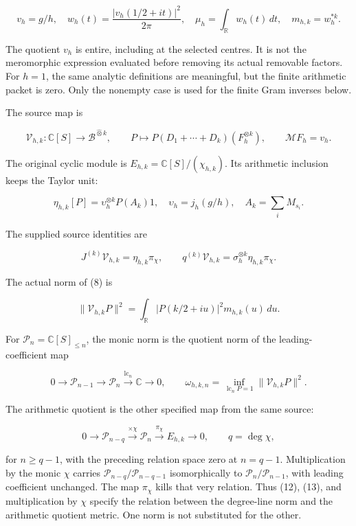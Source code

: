 \documentclass[
  11pt,
]{article}
\begin{document}
\[
 v_h=g/h,\quad
 w_h(t)=\frac{|v_h(1/2+it)|^2}{2\pi},\quad
 \mu_h=\int_{\mathbb R}w_h(t)\,dt,\quad m_{h,k}=w_h^{*k}.               \tag{7}
\]

The quotient \(v_h\) is entire, including at the selected centres. It is
not the meromorphic expression evaluated before removing its actual
removable factors. For \(h=1\), the same analytic definitions are
meaningful, but the finite arithmetic packet is zero. Only the nonempty
case is used for the finite Gram inverses below.

The source map is

\[
 \mathcal V_{h,k}:\mathbb C[S]\longrightarrow\mathscr B^{\widehat\otimes k},
 \qquad P\longmapsto P(D_1+\cdots+D_k)(F_h^{\otimes k}),\qquad
 \mathcal MF_h=v_h.                                                    \tag{8}
\]

The original cyclic module is \(E_{h,k}=\mathbb C[S]/(\chi_{h,k})\). Its
arithmetic inclusion keeps the Taylor unit:

\[
 \eta_{h,k}[P]=\upsilon_h^{\otimes k}P(A_k)1,\quad
 \upsilon_h=j_h(g/h),\quad A_k=\sum_iM_{s_i}.                           \tag{9}
\]

The supplied source identities are

\[
 J^{(k)}\mathcal V_{h,k}=\eta_{h,k}\pi_\chi,\qquad
 q^{(k)}\mathcal V_{h,k}=\sigma_h^{\otimes k}\eta_{h,k}\pi_\chi.          \tag{10}
\]

The actual norm of (8) is

\[
 \|\mathcal V_{h,k}P\|^2
 =\int_{\mathbb R}|P(k/2+iu)|^2m_{h,k}(u)\,du.                          \tag{11}
\]

For \(\mathcal P_n=\mathbb C[S]_{\le n}\), the monic norm is the
quotient norm of the leading-coefficient map

\[
 0\longrightarrow\mathcal P_{n-1}\longrightarrow\mathcal P_n
 \xrightarrow{\operatorname{lc}_n}\mathbb C\longrightarrow0,
 \qquad
 \omega_{h,k,n}=\inf_{\operatorname{lc}_nP=1}\|\mathcal V_{h,k}P\|^2.
                                                                         \tag{12}
\]

The arithmetic quotient is the other specified map from the same source:

\[
 0\longrightarrow\mathcal P_{n-q}
 \xrightarrow{\times\chi}\mathcal P_n
 \xrightarrow{\pi_\chi}E_{h,k}\longrightarrow0,\qquad q=\deg\chi,
                                                                         \tag{13}
\]

for \(n\ge q-1\), with the preceding relation space zero at \(n=q-1\).
Multiplication by the monic \(\chi\) carries
\(\mathcal P_{n-q}/\mathcal P_{n-q-1}\) isomorphically to
\(\mathcal P_n/\mathcal P_{n-1}\), with leading coefficient unchanged.
The map \(\pi_\chi\) kills that very relation. Thus (12), (13), and
multiplication by \(\chi\) specify the relation between the degree-line
norm and the arithmetic quotient metric. One norm is not substituted for
the other.
\end{document}
